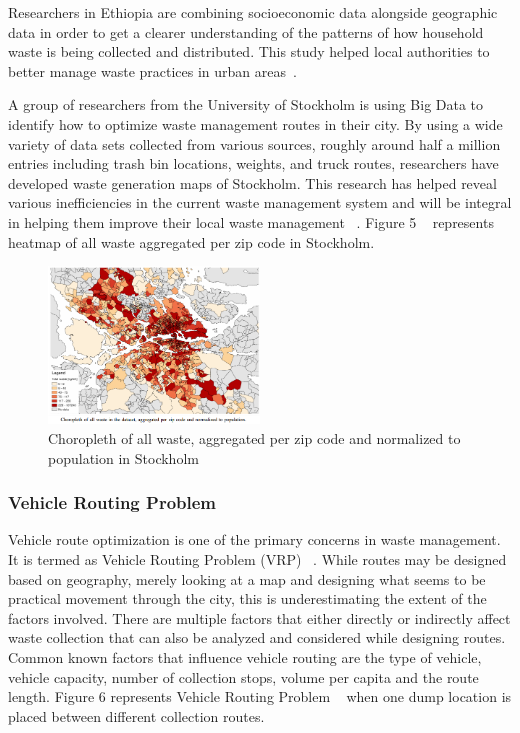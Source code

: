 \documentclass[sigconf]{acmart}
\begin{document}
Researchers in Ethiopia are combining socioeconomic data alongside geographic data in order to get a clearer understanding of the patterns of how household waste is being collected and distributed. This study helped local authorities to better manage waste practices in urban areas~\cite{markvan2016}. 

A group of researchers from the University of Stockholm is using Big Data to identify how to optimize waste management routes in their city. By using a wide variety of data sets collected from various sources, roughly around half a million entries including trash bin locations, weights, and truck routes, researchers have developed waste generation maps of Stockholm. This research has helped reveal various inefficiencies in the current waste management system and will be integral in helping them improve their local waste management ~\cite{markvan2016}.
Figure 5 ~\cite{shahrokni2014big}  represents heatmap of all waste aggregated per zip code in Stockholm.


\begin{figure}[ht!]
  \includegraphics[width=0.5\textwidth]{stockholm.png}
  \caption{Choropleth of all waste, aggregated per zip code and normalized to population in Stockholm}
\end{figure}

\subsubsection{Vehicle Routing Problem}
Vehicle route optimization is one of the primary concerns in waste management. It is termed as Vehicle Routing Problem (VRP) ~\cite{dantzig1959}.   While routes may be designed based on geography, merely looking at a map and designing what seems to be practical movement through the city, this is underestimating the extent of the factors involved.  There are multiple factors that either directly or indirectly affect waste collection that can also be analyzed and considered while designing routes. Common known factors that influence vehicle routing are the type of vehicle, vehicle capacity, number of collection stops, volume per capita and the route length. Figure 6 represents Vehicle Routing Problem  ~\cite{wikivrp2017} when one dump location is placed between different collection routes.
\end{document}
